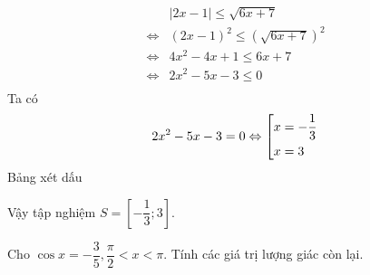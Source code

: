 \begin{bt}
{\begin{enumerate}
\begin{align*}
&|2x-1| \leq \sqrt{6x+7}\\
\Leftrightarrow & (2x-1)^2 \leq \left(\sqrt{6x+7} \right)^2\\
\Leftrightarrow & 4x^2-4x+1 \leq 6x+7\\
\Leftrightarrow & 2x^2-5x-3 \leq 0\\
\end{align*}
Ta có$$2x^2-5x-3=0 \Leftrightarrow \left[\begin{aligned}x&= - \dfrac{1}{3}\\ x&=3\end{aligned}\right.$$
Bảng xét dấu
\begin{center}
\end{center}
Vậy tập nghiệm $S=\left[- \dfrac{1}{3};3 \right].$
\end{enumerate}
}
\end{bt}
\begin{bt}%
Cho $\cos x = - \dfrac{3}{5}, \dfrac{\pi}{2}<x< \pi$. Tính các giá trị lượng giác còn lại.
\end{bt}
